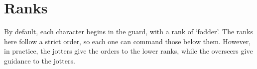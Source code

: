 \section{Ranks}

\begin{multicols}{2}

\noindent
By default, each character begins in the \gls{guard}, with a rank of `\gls{fodder}'.
The ranks here follow a strict order, so each one can command those below them.
However, in practice, the \glspl{jotter} give the orders to the lower ranks, while the \glspl{overseer} give guidance to the \glspl{jotter}.

\subsubsection{}

\subsubsection{}

\subsubsection{}

\subsubsection{}

\subsubsection{}

\subsubsection{}

\subsubsection{}

\subsubsection{}

\subsubsection{}

\end{multicols}
